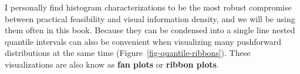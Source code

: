 \documentclass[
  letterpaper,
  DIV=11,
  numbers=noendperiod]{scrartcl}
\begin{document}
I personally find histogram characterizations to be the most robust
compromise between practical feasibility and visual information density,
and we will be using them often in this book. Because they can be
condensed into a single line nested quantile intervals can also be
convenient when visualizing many pushforward distributions at the same
time (Figure~\ref{fig-quantile-ribbons}). These visualizations are also
know as \textbf{fan plots} or \textbf{ribbon plots}.

\begin{figure}

\begin{minipage}[t]{0.05\linewidth}

{\centering 

~

}

\end{minipage}%
%
\begin{minipage}[t]{0.45\linewidth}

{\centering 


}

\subcaption{\label{fig-discrete-quantile-ribbons}}
\end{minipage}%
%
\begin{minipage}[t]{0.45\linewidth}

{\centering 

\raisebox{-\height}{

}}
\end{minipage}
\end{figure}
\end{document}
